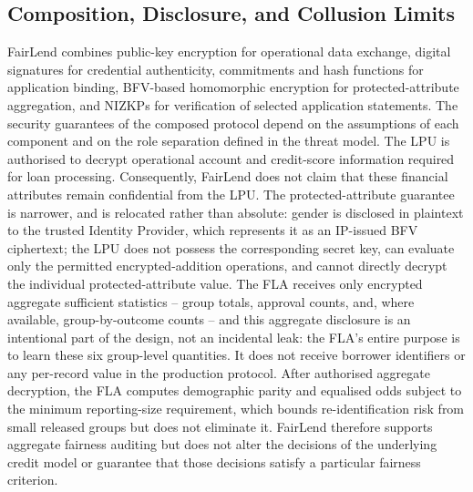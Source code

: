 \documentclass[a4paper,fleqn]{cas-dc}
\begin{document}
{\subsection{Composition, Disclosure, and Collusion Limits}
\label{subsec:composition_limits} FairLend combines public-key encryption for operational data exchange, digital signatures for credential authenticity, commitments and hash functions for application binding, BFV-based homomorphic encryption for protected-attribute aggregation, and NIZKPs for verification of selected application statements. The security guarantees of the composed protocol depend on the assumptions of each component and on the role separation defined in the threat model. The LPU is authorised to decrypt operational account and credit-score information required for loan processing. Consequently, FairLend does not claim that these financial attributes remain confidential from the LPU. The protected-attribute guarantee is narrower, and is relocated rather than absolute: gender is disclosed in plaintext to the trusted Identity Provider, which represents it as an IP-issued BFV ciphertext; the LPU does not possess the corresponding secret key, can evaluate only the permitted encrypted-addition operations, and cannot directly decrypt the individual protected-attribute value. The FLA receives only encrypted aggregate sufficient statistics -- group totals, approval counts, and, where available, group-by-outcome counts -- and this aggregate disclosure is an intentional part of the design, not an incidental leak: the FLA's entire purpose is to learn these six group-level quantities. It does not receive borrower identifiers or any per-record value in the production protocol. After authorised aggregate decryption, the FLA computes demographic parity and equalised odds subject to the minimum reporting-size requirement, which bounds re-identification risk from small released groups but does not eliminate it. FairLend therefore supports aggregate fairness auditing but does not alter the decisions of the underlying credit model or guarantee that those decisions satisfy a particular fairness criterion.

}
\end{document}
